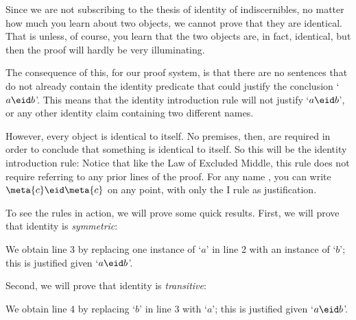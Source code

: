 Since we are not subscribing to the thesis of identity of indiscernibles, no matter how much you learn about two objects, we cannot prove that they are identical. That is unless, of course, you learn that the two objects are, in fact, identical, but then the proof will hardly be very illuminating.

The consequence of this, for our proof system, is that there are no sentences that do not already contain the identity predicate that could justify the conclusion `$a\eid b$'. This means that the identity introduction rule will not justify `$a\eid b$', or any other identity claim containing two different names.

However, every object is identical to itself. No premises, then, are required in order to conclude that something is identical to itself. So this will be the identity introduction rule:
Notice that like the Law of Excluded Middle, this rule does not require referring to any prior lines of the proof. For any name , you can write $\meta{c}\eid \meta{c}$ on any point, with only the {\eid }I rule as justification.


To see the rules in action, we will prove some quick results. First, we will prove that identity is \emph{symmetric}:
\begin{fitchproof}
	\open
	\close
\end{fitchproof}
We obtain line 3 by replacing one instance of `$a$' in line 2 with an instance of `$b$'; this is justified given `$a\eid  b$'.

Second, we will prove that identity is \emph{transitive}:
\begin{fitchproof}
	\open
	\close
\end{fitchproof}
We obtain line 4 by replacing `$b$' in line 3 with `$a$'; this is justified given `$a\eid  b$'.

